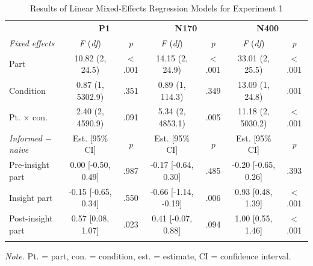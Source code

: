 \documentclass[
  english,
  doc,12pt,twoside,floatsintext]{apa7}
\begin{document}
\begin{table}[tbp]

\begin{center}
\begin{threeparttable}

\caption{\label{tab:exp1-table}Results of Linear Mixed-Effects Regression Models for Experiment 1\smallskip}

\footnotesize{

\begin{tabular}{lcccccc}
\toprule
 & \multicolumn{2}{c}{\textbf{P1}} & \multicolumn{2}{c}{\textbf{N170}} & \multicolumn{2}{c}{\textbf{N400}} \\
\cmidrule(r){2-3} \cmidrule(r){4-5} \cmidrule(r){6-7}
\textit{Fixed effects} & \textit{F} (\textit{df}) & \textit{p} & \textit{F} (\textit{df}) & \textit{p} & \textit{F} (\textit{df}) & \textit{p}\\
\midrule
Part & 10.82 (2, 24.5) & < .001 & 14.15 (2, 24.9) & < .001 & 33.01 (2, 25.5) & < .001\\
Condition & 0.87 (1, 5302.9) & .351 & 0.89 (1, 114.3) & .349 & 13.09 (1, 24.8) & .001\\
Pt. × con. & 2.40 (2, 4590.9) & .091 & 5.34 (2, 4853.1) & .005 & 11.18 (2, 5030.2) & < .001\\
\textit{Informed $-$  naive} & Est. [95\% CI] & \textit{p} & Est. [95\% CI] & \textit{p} & Est. [95\% CI] & \textit{p}\\ \midrule
Pre-insight part & 0.00 [-0.50, 0.49] & .987 & -0.17 [-0.64, 0.30] & .485 & -0.20 [-0.65, 0.26] & .393\\
Insight part & -0.15 [-0.65, 0.34] & .550 & -0.66 [-1.14, -0.19] & .006 & 0.93 [0.48, 1.39] & < .001\\
Post-insight part & 0.57 [0.08, 1.07] & .023 & 0.41 [-0.07, 0.88] & .094 & 1.00 [0.55, 1.46] & < .001\\
\bottomrule
\addlinespace
\end{tabular}

}

\begin{tablenotes}[para]
\normalsize{\textit{Note.} Pt. = part, con. = condition, est. = estimate, CI = confidence interval.}
\end{tablenotes}

\end{threeparttable}
\end{center}

\end{table}
\end{document}
